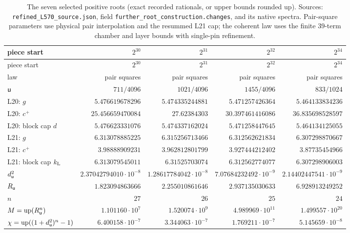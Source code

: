 {\scriptsize\setlength{\tabcolsep}{4pt}\renewcommand{\arraystretch}{0.95}
\begin{longtable}{@{}lrrrr@{}}
\caption{The seven selected positive roots (exact recorded rationals, or upper bounds rounded up). Sources: \texttt{refined\_L570\_source.json}, field \texttt{further\_root\_construction.changes}, and its native spectra. Pair-square parameters use physical pair interpolation and the resummed L21 cap; the coherent law uses the finite $39$-term chamber and layer bounds with single-pin refinement.}\label{tab:data:positive-roots}\\
\toprule
piece start & $2^{30}$ & $2^{31}$ & $2^{32}$ & $2^{34}$\\
\midrule\endfirsthead
\toprule
piece start & $2^{30}$ & $2^{31}$ & $2^{32}$ & $2^{34}$\\
\midrule\endhead
\bottomrule\endfoot
law & pair squares & pair squares & pair squares & pair squares\\
$\mathsf u$ & $711/4096$ & $1021/4096$ & $1455/4096$ & $833/1024$\\
L20: $g$ & $5.476619678296$ & $5.474335244881$ & $5.471257426364$ & $5.464133834236$\\
L20: $c^+$ & $25.456659470084$ & $27.62384303$ & $30.397461416086$ & $36.835698528597$\\
L20: block cap $d$ & $5.476623331076$ & $5.474337162024$ & $5.471258447645$ & $5.464134125055$\\
L21: $g$ & $6.313078885225$ & $6.315256713466$ & $6.312562621834$ & $6.307298870667$\\
L21: $c^+$ & $3.98888909231$ & $3.962812801799$ & $3.927444212402$ & $3.87735454966$\\
L21: block cap $k_{\rm L}$ & $6.313079545011$ & $6.31525703074$ & $6.312562774077$ & $6.307298906003$\\
$d_\mathsf u^2$ & $2.37042794010\cdot10^{-8}$ & $1.28617784042\cdot10^{-8}$ & $7.07684232492\cdot10^{-9}$ & $2.14402447541\cdot10^{-9}$\\
$R_\mathsf u$ & $1.823094863666$ & $2.255010861646$ & $2.937135030633$ & $6.928913249252$\\
$n$ & $27$ & $26$ & $25$ & $24$\\
$M=\operatorname{up}(R_\mathsf u^n)$ & $1.101160\cdot10^{7}$ & $1.520074\cdot10^{9}$ & $4.989969\cdot10^{11}$ & $1.499557\cdot10^{20}$\\
$\chi=\operatorname{up}((1+d_\mathsf u^2)^n-1)$ & $6.400158\cdot10^{-7}$ & $3.344063\cdot10^{-7}$ & $1.769211\cdot10^{-7}$ & $5.145659\cdot10^{-8}$\\
\end{longtable}
}


